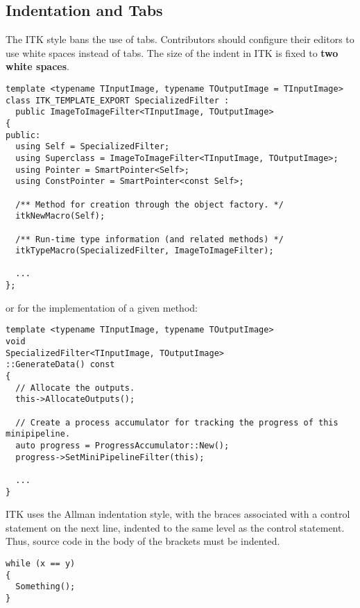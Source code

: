 \subsection{Indentation and Tabs}
\label{subsec:IndentationAndTabs}

The ITK style bans the use of tabs. Contributors should configure their editors
to use white spaces instead of tabs. The size of the indent in ITK is fixed to
\textbf{two white spaces}.

\small
\begin{verbatim}
template <typename TInputImage, typename TOutputImage = TInputImage>
class ITK_TEMPLATE_EXPORT SpecializedFilter :
  public ImageToImageFilter<TInputImage, TOutputImage>
{
public:
  using Self = SpecializedFilter;
  using Superclass = ImageToImageFilter<TInputImage, TOutputImage>;
  using Pointer = SmartPointer<Self>;
  using ConstPointer = SmartPointer<const Self>;

  /** Method for creation through the object factory. */
  itkNewMacro(Self);

  /** Run-time type information (and related methods) */
  itkTypeMacro(SpecializedFilter, ImageToImageFilter);

  ...
};
\end{verbatim}
\normalsize

or for the implementation of a given method:

\small
\begin{verbatim}
template <typename TInputImage, typename TOutputImage>
void
SpecializedFilter<TInputImage, TOutputImage>
::GenerateData() const
{
  // Allocate the outputs.
  this->AllocateOutputs();

  // Create a process accumulator for tracking the progress of this minipipeline.
  auto progress = ProgressAccumulator::New();
  progress->SetMiniPipelineFilter(this);

  ...
}
\end{verbatim}
\normalsize

ITK uses the Allman indentation style, with the braces associated with a
control statement on the next line, indented to the same level as the control
statement. Thus, source code in the body of the brackets must be indented.

\small
\begin{verbatim}
while (x == y)
{
  Something();
}
\end{verbatim}
\normalsize


